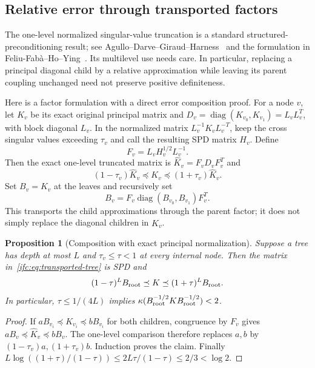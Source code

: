 \documentclass[11pt]{amsart}
\newtheorem{proposition}[theorem]{Proposition}
\theoremstyle{definition}\newtheorem{definition}[theorem]{Definition}
\theoremstyle{remark}\newtheorem{remark}[theorem]{Remark}
\numberwithin{equation}{section}
\newcommand{\diag}{\operatorname{diag}}
\begin{document}
\subsection{Relative error through transported factors}

The one-level normalized singular-value truncation is a standard
structured-preconditioning result; see
Agullo--Darve--Giraud--Harness~\cite{ADGH2018} and the formulation in
Feliu-Fab\`a--Ho--Ying~\cite[Proposition 1.1]{FHY2020}.
Its multilevel use needs care. In particular, replacing a principal
diagonal child by a relative approximation while leaving its parent
coupling unchanged need not preserve positive definiteness.

Here is a factor formulation with a direct error composition proof.
For a node $v$, let $K_v$ be its exact original principal matrix and
$D_v=\diag(K_{v_0},K_{v_1})=L_vL_v^T$, with block diagonal $L_v$.
In the normalized matrix $L_v^{-1}K_vL_v^{-T}$, keep the cross singular
values exceeding $\tau_v$ and call the resulting SPD matrix $H_v$.
Define
\[
 F_v=L_vH_v^{1/2}L_v^{-1}.
\]
Then the exact one-level truncated matrix is
$\widehat K_v=F_vD_vF_v^T$ and
\[
 (1-\tau_v)\widehat K_v\preceq K_v
 \preceq(1+\tau_v)\widehat K_v.
\]
Set $B_v=K_v$ at the leaves and recursively set
\begin{equation}\label{ifc:eq:transported-tree}
 B_v=F_v\diag(B_{v_0},B_{v_1})F_v^T.
\end{equation}
This transports the child approximations through the parent factor;
it does not simply replace the diagonal children in $\widehat K_v$.

\begin{proposition}[Composition with exact principal normalization]
Suppose a tree has depth at most $L$ and $\tau_v\le\tau<1$ at every
internal node. Then the matrix in~\eqref{ifc:eq:transported-tree} is SPD and
\[
 (1-\tau)^L B_{\rm root}\preceq K
 \preceq(1+\tau)^L B_{\rm root}.
\]
In particular, $\tau\le1/(4L)$ implies
$\kappa(B_{\rm root}^{-1/2}KB_{\rm root}^{-1/2})<2$.
\end{proposition}
\begin{proof}
If $aB_{v_i}\preceq K_{v_i}\preceq bB_{v_i}$ for both children,
congruence by $F_v$ gives
$aB_v\preceq\widehat K_v\preceq bB_v$.
The one-level comparison therefore replaces $a,b$ by
$(1-\tau_v)a,(1+\tau_v)b$. Induction proves the claim.
Finally
$L\log((1+\tau)/(1-\tau))\le2L\tau/(1-\tau)\le2/3<\log2$.
\end{proof}
\end{document}
